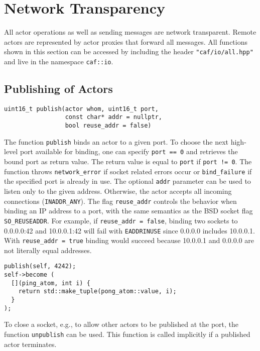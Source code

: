 \section{Network Transparency}

All actor operations as well as sending messages are network transparent.
Remote actors are represented by actor proxies that forward all messages.
All functions shown in this section can be accessed by including the header \lstinline^"caf/io/all.hpp"^ and live in the namespace \lstinline^caf::io^.

\subsection{Publishing of Actors}

\begin{lstlisting}
uint16_t publish(actor whom, uint16_t port,
                 const char* addr = nullptr,
                 bool reuse_addr = false)
\end{lstlisting}

The function \lstinline^publish^ binds an actor to a given port.
To choose the next high-level port available for binding, one can specify \lstinline^port == 0^ and retrieves the bound port as return value.
The return value is equal to \lstinline^port^ if \lstinline^port != 0^.
The function throws \lstinline^network_error^ if socket related errors occur or \lstinline^bind_failure^ if the specified port is already in use.
The optional \lstinline^addr^ parameter can be used to listen only to the given address.
Otherwise, the actor accepts all incoming connections (\lstinline^INADDR_ANY^).
The flag \lstinline^reuse_addr^ controls the behavior when binding an IP
address to a port, with the same semantics as the BSD socket flag \lstinline^SO_REUSEADDR^.
For example, if \lstinline^reuse_addr = false^, binding two sockets to 0.0.0.0:42 and 10.0.0.1:42 will fail with \texttt{EADDRINUSE} since 0.0.0.0 includes 10.0.0.1. 
With \lstinline^reuse_addr = true^ binding would succeed because 10.0.0.1 and
0.0.0.0 are not literally equal addresses.


\begin{lstlisting}
publish(self, 4242);
self->become (
  [](ping_atom, int i) {
    return std::make_tuple(pong_atom::value, i);
  }
);
\end{lstlisting}

To close a socket, e.g., to allow other actors to be published at the port, the function \lstinline^unpublish^ can be used.
This function is called implicitly if a published actor terminates.

